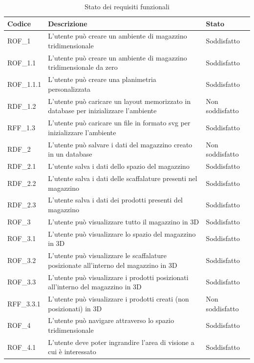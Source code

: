\renewcommand{\arraystretch}{2.5}
\begin{xltabular}{\textwidth}{ p{0.1\textwidth} | X | p{0.3\textwidth} }
    \textbf{\color{white} Codice} & \textbf{\color{white} Descrizione} & \textbf{\color{white} Stato} \\ 
    \endhead

    \caption{Stato dei requisiti funzionali} 
    \endlastfoot

    ROF\_1 & L'utente può creare un ambiente di magazzino tridimensionale & Soddisfatto\\
    ROF\_1.1 & L'utente può creare un ambiente di magazzino tridimensionale da zero & Soddisfatto\\
    ROF\_1.1.1 & L'utente può creare una planimetria personalizzata & Soddisfatto\\
    RDF\_1.2 & L'utente può caricare un layout memorizzato in database per inizializzare l'ambiente & Non soddisfatto\\
    RFF\_1.3 & L'utente può caricare un file in formato svg per inizializzare l'ambiente & Soddisfatto \\
    RDF\_2 & L'utente può salvare i dati del magazzino creato in un database & Non soddisfatto\\  
    RDF\_2.1 & L'utente salva i dati dello spazio del magazzino & Soddisfatto \\ 
    RDF\_2.2 & L'utente salva i dati delle scaffalature presenti nel magazzino & Soddisfatto \\  
    RDF\_2.3 & L'utente salva i dati dei prodotti presenti del magazzino & Soddisfatto \\    
    ROF\_3 & L'utente può visualizzare tutto il magazzino in 3D & Soddisfatto\\
    ROF\_3.1 & L'utente può visualizzare lo spazio del magazzino in 3D & Soddisfatto\\
    ROF\_3.2 & L'utente può visualizzare le scaffalature posizionate all'interno del magazzino in 3D & Soddisfatto\\
    ROF\_3.3 & L'utente può visualizzare i prodotti posizionati all'interno del magazzino in 3D & Soddisfatto\\
    RFF\_3.3.1 & L'utente può visualizzare i prodotti creati (non posizionati) in 3D & Non soddisfatto \\      
    ROF\_4 & L'utente può navigare attraverso lo spazio tridimensionale & Soddisfatto\\
    ROF\_4.1 & L'utente deve poter ingrandire l'area di visione a cui è interessato & Soddisfatto \\

\end{xltabular}
